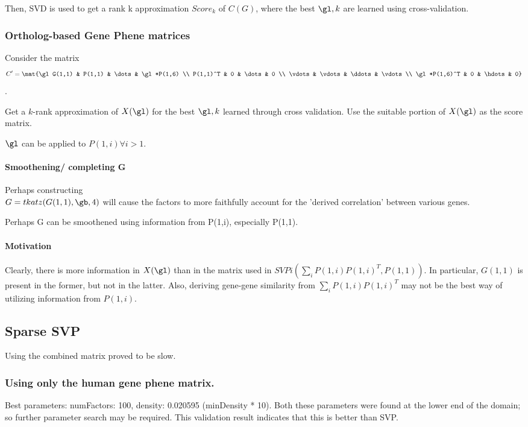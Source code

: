 \documentclass{report}
\begin{document}
Then, SVD is used to get a rank k approximation $Score_k$ of $C(G)$, where the best $\gl, k$ are learned using cross-validation.

\subsubsection{Ortholog-based Gene Phene matrices}
Consider the matrix
$$C' = \mat{\gl G(1,1) & P(1,1) & \dots & \gl*P(1,6) \\
           P(1,1)^T & 0 & \dots & 0 \\
           \vdots & \vdots & \ddots & \vdots \\
           \gl*P(1,6)^T & 0 & \hdots & 0}$$.

Get a $k$-rank approximation of $X(\gl)$ for the best $\gl, k$ learned through cross validation. Use the suitable portion of $X(\gl)$ as the score matrix.

$\gl$ can be applied to $P(1,i) \forall i>1$.

\paragraph*{Smoothening/ completing G}
Perhaps constructing \\
$G = tkatz(G(1,1), \gb, 4)$ will cause the factors to more faithfully account for the 'derived correlation' between various genes.

Perhaps G can be smoothened using information from P(1,i), especially P(1,1).

\paragraph*{Motivation}
Clearly, there is more information in $X(\gl)$ than in the matrix used in $SVPi(\sum_i P(1,i)P(1,i)^T,P(1,1))$. In particular, $G(1,1)$ is present in the former, but not in the latter. Also, deriving gene-gene similarity from $\sum_i P(1,i)P(1,i)^T$ may not be the best way of utilizing information from $P(1,i)$.

\subsection{Sparse SVP}
Using the combined matrix proved to be slow.

\subsubsection{Using only the human gene phene matrix.}
Best parameters: numFactors: 100, density: 0.020595 (minDensity * 10). Both these parameters were found at the lower end of the domain; so further parameter search may be required. This validation result indicates that this is better than SVP.
\end{document}
